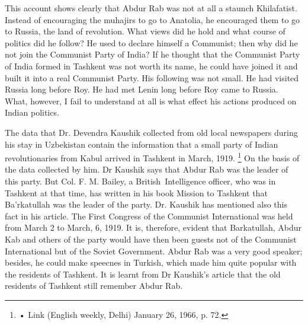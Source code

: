 This account shows clearly that Abdur Rab was not at all a staunch Khilafatist. Instead of encouraging the muhajirs to go to Anatolia, he encouraged them to go to Russia, the land of revolution. What views did he hold and what course of politics did he follow? He used to declare himself a Communist; then why did he not join the Communist Party of India? If he thought that the Communist Party of India formed in 
Tashkent was not worth its name, he could have joined it and built it into a real Communist Party. His following was not small. He had visited Russia long before Roy. He had met Lenin long before Roy came to Russia. What, however, I fail to understand at all is what effect his actions produced on Indian politics. 

The data that Dr. Devendra Kaushik collected from old local newspapers during his stay in Uzbekistan contain the information that a small party of Indian revolutionaries from Kabul arrived in Tashkent in March, 1919. \footnote{• Link (English weekly, Delhi) January 26, 1966, p. 72. } 
On the basis of the data collected by him. Dr Kaushik says that Abdur Rab was the leader of this party. But Col. F. M. Bailey, a British\ Intelligence officer, who was in Tashkent at that time, has written in his book Mission to Tashkent that Ba'rkatullah was the leader of the party. Dr. Kaushik has mentioned also this fact in his article. The First Congress of the Communist International was held from March 2 to March, 6, 1919. It is, therefore, evident that Barkatullah, Abdur Kab and others of the party would have then been guests not of the Communist 
International but of the Soviet Government. Abdur Rab was a very good speaker; besides, he could make speecnes in Turkish, which made him quite popular with the residents of Tashkent. It is learnt from Dr Kaushik’s article that the old residents of Tashkent still remember Abdur Rab. 

